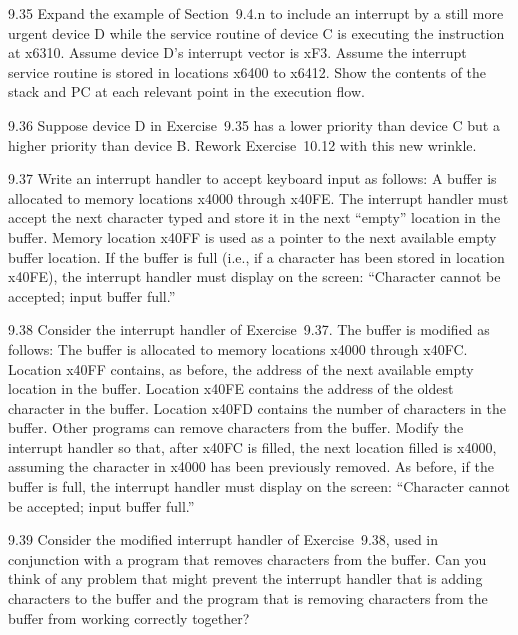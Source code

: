 \documentclass{patt}
\begin{document}
\begin{exercises}
\item[9.35] Expand the example of Section~9.4.n to include an interrupt by a
  still more urgent device D while the service routine of device C is
  executing the instruction at x6310. Assume device D's interrupt
  vector is xF3.  Assume the interrupt service routine is stored in
  locations x6400 to x6412. Show the contents of the stack and PC at
  each relevant point in the execution flow.

\item[9.36] Suppose device D in Exercise~9.35 has a lower priority than device C
  but a higher priority than device B. Rework Exercise~10.12 with this
  new wrinkle.

\item[9.37] Write an interrupt handler to accept keyboard input as follows: A
  buffer is allocated to memory locations x4000 through x40FE. The
  interrupt handler must accept the next character typed and store it
  in the next ``empty'' location in the buffer. Memory location x40FF
  is used as a pointer to the next available empty buffer location. If
  the buffer is full (i.e., if a character has been stored in location
  x40FE), the interrupt handler must display on the screen:
  ``Character cannot be accepted; input buffer full.''

\item[9.38] Consider the interrupt handler of Exercise~9.37. The buffer is
  modified as follows: The buffer is allocated to memory locations
  x4000 through x40FC. Location x40FF contains, as before, the address
  of the next available empty location in the buffer. Location x40FE
  contains the address of the oldest character in the buffer. Location
  x40FD contains the number of characters in the buffer. Other
  programs can remove characters from the buffer. Modify the interrupt
  handler so that, after x40FC is filled, the next location filled is
  x4000, assuming the character in x4000 has been previously removed.
  As before, if the buffer is full, the interrupt handler must display
  on the screen: ``Character cannot be accepted; input buffer full.''

\item[9.39] Consider the modified interrupt handler of Exercise~9.38, used in
  conjunction with a program that removes characters from the buffer.
  Can you think of any problem that might prevent the interrupt
  handler that is adding characters to the buffer and the program that
  is removing characters from the buffer from working correctly
  together?


\end{exercises}
\end{document}
